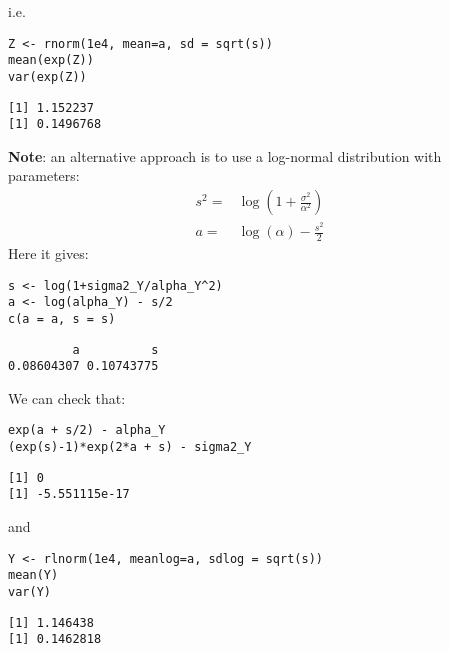 \documentclass[12pt]{article}
\begin{document}
i.e.
\lstset{language=r,label= ,caption= ,captionpos=b,numbers=none}
\begin{lstlisting}
Z <- rnorm(1e4, mean=a, sd = sqrt(s))
mean(exp(Z))
var(exp(Z))
\end{lstlisting}

\begin{verbatim}
[1] 1.152237
[1] 0.1496768
\end{verbatim}

\textbf{Note}: an alternative approach is to use a log-normal distribution with
parameters:
\begin{align*}
s^2 =&\log\left(1+\frac{\sigma^2}{\alpha^2}\right) \\
a =&\log(\alpha) - \frac{s^2}{2} 
\end{align*}
Here it gives:
\lstset{language=r,label= ,caption= ,captionpos=b,numbers=none}
\begin{lstlisting}
s <- log(1+sigma2_Y/alpha_Y^2)
a <- log(alpha_Y) - s/2
c(a = a, s = s)
\end{lstlisting}

\begin{verbatim}
         a          s 
0.08604307 0.10743775
\end{verbatim}

We can check that:
\lstset{language=r,label= ,caption= ,captionpos=b,numbers=none}
\begin{lstlisting}
exp(a + s/2) - alpha_Y
(exp(s)-1)*exp(2*a + s) - sigma2_Y
\end{lstlisting}

\begin{verbatim}
[1] 0
[1] -5.551115e-17
\end{verbatim}

and
\lstset{language=r,label= ,caption= ,captionpos=b,numbers=none}
\begin{lstlisting}
Y <- rlnorm(1e4, meanlog=a, sdlog = sqrt(s))
mean(Y)
var(Y)
\end{lstlisting}

\begin{verbatim}
[1] 1.146438
[1] 0.1462818
\end{verbatim}
\end{document}
